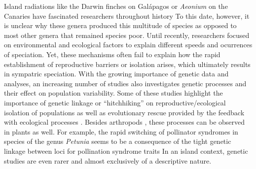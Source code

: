 \documentclass[a4paper]{scrartcl}
\begin{document}
Island radiations like the Darwin finches on Galápagos or \textit{Aeonium} on the Canaries have fascinated researchers throughout history %
To this date, however, it is unclear why these genera produced this multitude of species as opposed to most other genera that remained species poor.
Until recently, researchers focused on environmental and ecological factors to explain different speeds and ocurrences of speciation.\cite{krugSpeciesGenusRatios2008}\cite{hurlbertProcessesGeneratingLatitudinal2014}\cite{willisSpeciesDiversityScale2002}
Yet, these mechanisms often fail to explain how the rapid establishment of reproductive barriers or isolation arises,
which ultimately results in sympatric speciation. %
With the growing importance of genetic data and analyses, an increasing number of studies also investigates genetic processes and
their effect on population variability. %
Some of these studies highlight the importance of genetic linkage or ``hitchhiking'' on reproductive/ecological isolation of populations \cite{hawthorneGeneticLinkageEcological2001}\cite{viaGeneticMosaicSuggests2008}%
as well as evolutionary rescue provided by the feedback with ecological processes \cite{schiffersLimitedEvolutionaryRescue2012}.
Besides arthropods \cite{hawthorneGeneticLinkageEcological2001}, these processes can be observed in plants as well. %
For example, the rapid switching of pollinator syndromes in species of the genus \textit{Petunia} %
seems to be a consequence of the tight genetic linkage between loci for pollination syndrome traits \cite{hermannTightGeneticLinkage2013}
In an island context, genetic studies are even rarer and almost exclusively of a descriptive nature.
\end{document}
